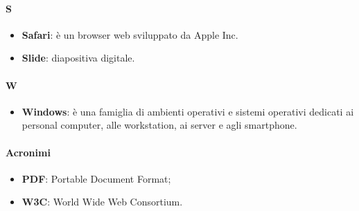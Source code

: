 \paragraph{S}
\begin{itemize}
	\item[] \textbf{Safari}: è un browser web sviluppato da Apple Inc.
	\item[] \textbf{Slide}: diapositiva digitale.
\end{itemize}
\newpage

\paragraph{W}
\begin{itemize}
	\item[] \textbf{Windows}: è una famiglia di ambienti operativi e sistemi operativi dedicati ai personal computer, alle workstation, ai server e agli smartphone.
\end{itemize}
\newpage

\paragraph{Acronimi}
\begin{itemize}
	\item[] \textbf{PDF}: Portable Document Format;
	\item[] \textbf{W3C}: World Wide Web Consortium.
\end{itemize}